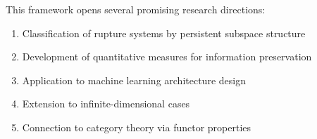 \documentclass[12pt]{article}
\theoremstyle{definition}
\theoremstyle{plain}
\begin{document}
This framework opens several promising research directions:
\begin{enumerate}
    \item Classification of rupture systems by persistent subspace structure
    \item Development of quantitative measures for information preservation
    \item Application to machine learning architecture design
    \item Extension to infinite-dimensional cases
    \item Connection to category theory via functor properties
\end{enumerate}
\end{document}
